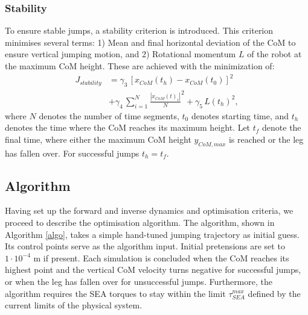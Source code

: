 \documentclass[letterpaper, 10 pt, conference]{ieeeconf}  %
\begin{document}
\subsubsection{Stability}
To ensure stable jumps, a stability criterion is introduced. This criterion minimises several terms: 1) Mean and final horizontal deviation of the CoM to ensure vertical jumping motion, and 2) Rotational momentum $L$ of the robot at the maximum CoM height.
These are achieved with the minimization of:
\begin{equation}
	\begin{aligned}
		J_{stability} & =  \gamma_3 \, \left[ x_{CoM}(t_h) - x_{CoM}(t_0) \right]^2 \\
		& + \gamma_4 \, \sum^{N}_{i=1}\frac{| x_{CoM}(t)_i |}{N}^2   
+ \gamma_5 \, L(t_h)^2,
	\end{aligned}
\end{equation}
where $N$ denotes the number of time segments, $t_0$ denotes starting time, and $t_h$ denotes the time where the CoM reaches its maximum height. Let $t_f$ denote the final time, where either the maximum CoM height $y_{CoM,max}$ is reached or the leg has fallen over. For successful jumps $t_h=t_f$.

\subsection{Algorithm}
\label{subsec:algorithm}
Having set up the forward and inverse dynamics and optimisation criteria, we proceed to describe the optimisation algorithm. The algorithm, shown in Algorithm \ref{algo}, takes a simple hand-tuned jumping trajectory as initial guess. Its control points serve as the algorithm input. Initial pretensions are set to $1 \cdot 10^{-4}$ m if present. Each simulation is concluded when the CoM reaches its highest point and the vertical CoM velocity turns negative for successful jumps, or when the leg has fallen over for unsuccessful jumps. Furthermore, the algorithm requires the SEA torques to stay within the limit $\tau_{SEA}^{max}$ defined by the current limits of the physical system.
\end{document}
